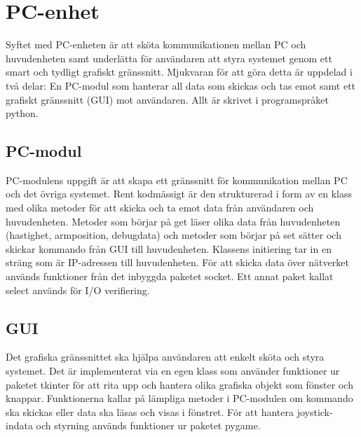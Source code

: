 
\section{PC-enhet}
Syftet med PC-enheten är att sköta kommunikationen mellan PC och huvudenheten samt
underlätta för användaren att styra systemet genom ett smart och tydligt grafiskt gränssnitt.
Mjukvaran för att göra detta är uppdelad i två delar: En PC-modul som hanterar all data som
skickas och tas emot samt ett grafiskt gränssnitt (GUI) mot användaren. Allt är skrivet i
programspråket python.


\subsection{PC-modul}
PC-modulens uppgift är att skapa ett gränssnitt för kommunikation mellan PC och det övriga
systemet. Rent kodmässigt är den strukturerad i form av en klass med olika metoder för att skicka
och ta emot data från användaren och huvudenheten. Metoder som börjar på get läser olika data från
huvudenheten (hastighet, armposition, debugdata) och metoder som börjar på set sätter och skickar
kommando från GUI till huvudenheten. Klassens initiering tar in en sträng som är IP-adressen till
huvudenheten. För att skicka data över nätverket används funktioner från det inbyggda paketet
socket. Ett annat paket kallat select används för I/O verifiering.

\subsection{GUI}
Det grafiska gränssnittet ska hjälpa användaren att enkelt sköta och styra systemet.
Det är implementerat via en egen klass som använder funktioner ur paketet tkinter för att rita
upp och hantera olika grafiska objekt som fönster och knappar. Funktionerna kallar på lämpliga
metoder i PC-modulen om kommando ska skickas eller data ska läsas och visas i fönstret. För att
hantera joystick-indata och styrning används funktioner ur paketet pygame.

